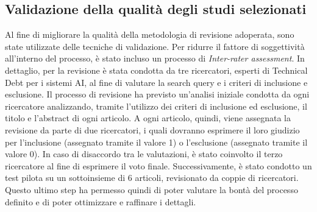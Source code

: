\subsection{Validazione della qualità degli studi selezionati}
Al fine di migliorare la qualità della metodologia di revisione adoperata, sono state utilizzate delle tecniche di validazione.
Per ridurre il fattore di soggettività all'interno del processo, è stato incluso un processo di \textit{Inter-rater assessment}.
In dettaglio, per la revisione è stata condotta da tre ricercatori, esperti di Technical Debt per i sistemi AI, al fine di valutare la search query e i criteri di inclusione e esclusione.
Il processo di revisione ha previsto un'analisi iniziale condotta da ogni ricercatore analizzando, tramite l'utilizzo dei criteri di inclusione ed esclusione, il titolo e l'abstract di ogni articolo.
A ogni articolo, quindi, viene assegnata la revisione da parte di due ricercatori, i quali dovranno esprimere il loro giudizio per l'inclusione (assegnato tramite il valore 1) o l'esclusione (assegnato tramite il valore 0).
In caso di disaccordo tra le valutazioni, è stato coinvolto il terzo ricercatore al fine di esprimere il voto finale.
Successivamente, è stato condotto un test pilota su un sottoinsieme di 6 articoli, revisionato da coppie di ricercatori.
Questo ultimo step ha permesso quindi di poter valutare la bontà del processo definito e di poter ottimizzare e raffinare i dettagli.

